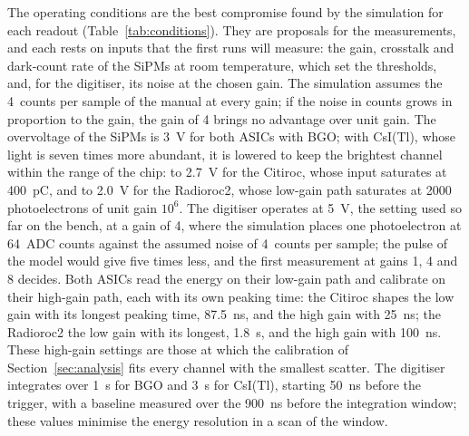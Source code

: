 \documentclass[11pt]{article}
\newcommand{\us}{\textmu s\xspace}
\newcommand{\csitl}{CsI(Tl)\xspace}
\begin{document}
The operating conditions are the best compromise found by the simulation
for each readout (Table~\ref{tab:conditions}). They are proposals for the
measurements, and each rests on inputs that the first runs will measure:
the gain, crosstalk and dark-count rate of the SiPMs at room temperature,
which set the thresholds, and, for the digitiser, its noise at the chosen
gain. The simulation assumes the 4~counts per sample of the manual at every
gain; if the noise in counts grows in proportion to the gain, the gain
of 4 brings no advantage over unit gain. The overvoltage of the SiPMs is 3~V for both
ASICs with BGO; with \csitl, whose light is seven times more abundant, it
is lowered to keep the brightest channel within the range of the chip:
to 2.7~V for the Citiroc, whose input saturates at 400~pC, and to 2.0~V for
the Radioroc2, whose low-gain path saturates at 2000 photoelectrons of
unit gain $10^6$. The digitiser operates at 5~V, the setting used so far
on the bench, at a gain of 4, where the simulation places one
photoelectron at 64~ADC counts against the assumed noise of 4~counts per
sample; the pulse of the model would give five times less, and the first
measurement at gains 1, 4 and 8 decides. Both ASICs read the energy on
their low-gain path and calibrate on their high-gain path, each with its
own peaking time: the Citiroc shapes the low gain with its longest peaking
time, 87.5~ns, and the high gain with 25~ns; the Radioroc2 the low gain
with its longest, 1.8~\us, and the high gain with 100~ns. These high-gain
settings are those at which the calibration of Section~\ref{sec:analysis}
fits every channel with the smallest scatter. The digitiser integrates over
1~\us for BGO and 3~\us for \csitl, starting 50~ns before the trigger,
with a baseline measured over the 900~ns before the integration window;
these values minimise the energy resolution in a scan of the window.
\end{document}
